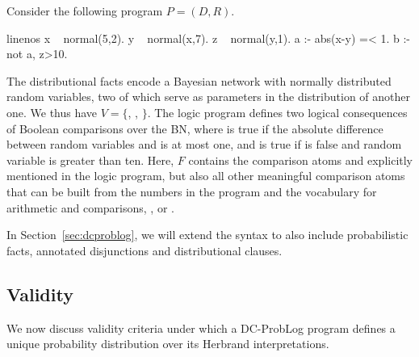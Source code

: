 \begin{example}\label{ex:random_choice_dependency}
Consider the  following \dcproblogsty program $P=(D,R)$.
\begin{problog*}{linenos}
x ~ normal(5,2).
y ~ normal(x,7).
z ~ normal(y,1).
a :- abs(x-y) =< 1. 
b :- not a, z>10.
\end{problog*}
The distributional facts encode a Bayesian network with  normally distributed random variables, two of which serve as parameters in the distribution of another one. We thus have $V=\{$, , $\}$.
The logic program defines two logical consequences of Boolean comparisons over the BN, where  is true if the absolute difference between random variables  and  is at most one, and  is true if  is false and random variable  is greater than ten. 
Here, $F$ contains the comparison atoms  and  explicitly mentioned in the logic program, but also all other meaningful comparison atoms that can be built from the numbers in the program and the vocabulary for arithmetic and comparisons, \eg,  or . 
\end{example}
In Section~\ref{sec:dcproblog}, we will extend the syntax to also include probabilistic facts, annotated disjunctions and distributional clauses.

\subsection{Validity}\label{sec:dcplpvalidity}
We now discuss validity criteria under which a 
DC-ProbLog program defines a unique probability distribution over its Herbrand interpretations. 

